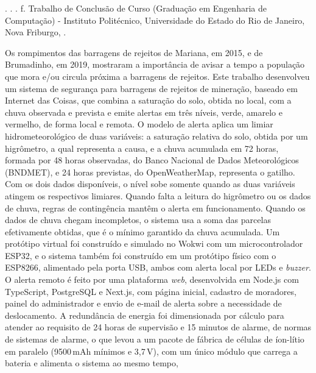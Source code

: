 \begin{resumo}
\begin{SingleSpace}

\noindent
\entradaAutor{}. \textit{\imprimirtitulo}. \the\year. \pageref{LastPage} f. Trabalho de Conclusão de Curso (Graduação em Engenharia de Computação) - Instituto Politécnico, Universidade do Estado do Rio de Janeiro, Nova Friburgo, \the\year.
\vspace{\onelineskip}

\setlength{\parindent}{1.3cm}

Os rompimentos das barragens de rejeitos de Mariana, em 2015, e de
Brumadinho, em 2019, mostraram a importância de avisar a tempo a
população que mora e/ou circula próxima a barragens de rejeitos. Este
trabalho desenvolveu um sistema de segurança para barragens de rejeitos
de mineração, baseado em Internet das Coisas, que combina a saturação do
solo, obtida no local, com a chuva observada e prevista e emite alertas
em três níveis, verde, amarelo e vermelho, de forma local e remota. O
modelo de alerta aplica um limiar hidrometeorológico de duas variáveis:
a saturação relativa do solo, obtida por um higrômetro, a qual representa a causa, e a chuva acumulada em 72 horas, formada por 48 horas
observadas, do Banco Nacional de Dados Meteorológicos (BNDMET), e 24
horas previstas, do OpenWeatherMap, representa o gatilho. Com os dois
dados disponíveis, o nível sobe somente quando as duas variáveis atingem
os respectivos limiares. Quando falta a leitura do higrômetro ou os
dados de chuva, regras de contingência mantêm o alerta em funcionamento.
Quando os dados de chuva chegam incompletos, o sistema usa a soma das
parcelas efetivamente obtidas, que é o mínimo garantido da chuva
acumulada. Um protótipo virtual foi construído e simulado no Wokwi com
um microcontrolador ESP32, e o sistema também foi construído em um
protótipo físico com o ESP8266, alimentado pela porta USB, ambos com
alerta local por LEDs e \textit{buzzer}. O alerta remoto é feito por uma
plataforma \textit{web}, desenvolvida em Node.js com TypeScript,
PostgreSQL e Next.js, com página inicial, cadastro de moradores, painel
do administrador e envio de e-mail de alerta sobre a necessidade de
deslocamento. A redundância de energia foi dimensionada por cálculo para
atender ao requisito de 24 horas de supervisão e 15 minutos de alarme,
de normas de sistemas de alarme, o que levou a um pacote de fábrica de
células de íon-lítio em paralelo (9500\,mAh mínimos e 3,7\,V), com um
único módulo que carrega a bateria e alimenta o sistema ao mesmo tempo,

\end{SingleSpace}
\end{resumo}
